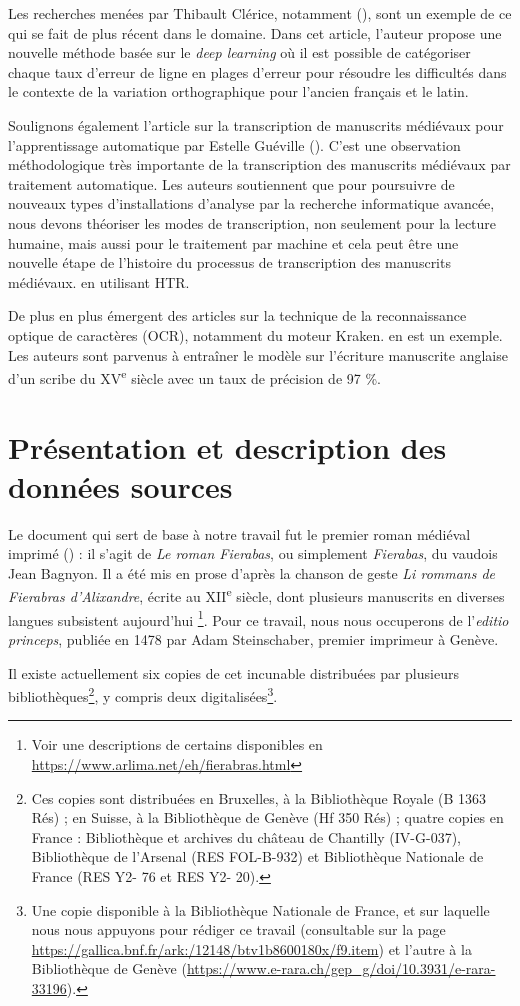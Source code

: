 \documentclass{article}
\begin{document}
Les recherches menées par Thibault Clérice, notamment  (\cite{clerice_ground-truth_2022}), sont un exemple de ce qui se fait de plus récent dans le domaine. Dans cet article, l’auteur propose une nouvelle méthode basée sur le \emph{deep learning} où il est possible de catégoriser chaque taux d'erreur de ligne en plages d'erreur pour résoudre les difficultés dans le contexte de la variation orthographique pour l'ancien français et le latin.

Soulignons également l'article sur la transcription de manuscrits médiévaux pour l'apprentissage automatique par Estelle Guéville (\cite{gueville_transcribing_2023}). C'est une observation méthodologique très importante de la transcription des manuscrits médiévaux par traitement automatique. Les auteurs soutiennent que pour poursuivre de nouveaux types d'installations d'analyse par la recherche informatique avancée, nous devons théoriser les modes de transcription, non seulement pour la lecture humaine, mais aussi pour le traitement par machine et cela peut être une nouvelle étape de l'histoire du processus de transcription des manuscrits médiévaux. en utilisant HTR.

De plus en plus émergent des articles sur la technique de la  reconnaissance optique de caractères (OCR), notamment du moteur Kraken. \cite{schoen_optical_2022} en est un exemple. Les auteurs sont parvenus à entraîner le modèle sur l'écriture manuscrite anglaise d'un scribe du XV\textsuperscript{e} siècle avec un taux de  précision de 97 \%.


\section{Présentation et description des données sources}

    Le document qui sert de base à notre travail fut le premier roman médiéval imprimé (\cite{lambert_notice_2017}) : il s’agit de \emph{Le roman Fierabas}, ou simplement \emph{Fierabas}, du vaudois Jean Bagnyon. Il a été mis en prose d'après la chanson de geste \emph{Li rommans de Fierabras d'Alixandre}, écrite au XII\textsuperscript{e} siècle, dont plusieurs manuscrits en diverses langues subsistent aujourd’hui \footnote{Voir une descriptions de certains disponibles en \url{https://www.arlima.net/eh/fierabras.html}}. Pour ce travail, nous nous occuperons de l’\emph{editio princeps}, publiée en 1478 par Adam Steinschaber, premier imprimeur à Genève.  
    
     Il existe actuellement six copies de cet incunable distribuées par plusieurs bibliothèques\footnote{Ces copies sont distribuées en Bruxelles, à la Bibliothèque Royale (B 1363 Rés) ; en Suisse, à la Bibliothèque de Genève (Hf 350 Rés) ; quatre copies en France : Bibliothèque et archives du château de Chantilly (IV-G-037), Bibliothèque de l’Arsenal (RES FOL-B-932) et Bibliothèque Nationale de France (RES Y2- 76 et RES Y2- 20).}, y compris deux digitalisées\footnote{Une copie disponible à la Bibliothèque Nationale de France, et sur laquelle nous nous appuyons pour rédiger ce travail (consultable sur la page \url{https://gallica.bnf.fr/ark:/12148/btv1b8600180x/f9.item}) et l’autre à la Bibliothèque de Genève (\url{https://www.e-rara.ch/gep_g/doi/10.3931/e-rara-33196}).}.
     
\end{document}
